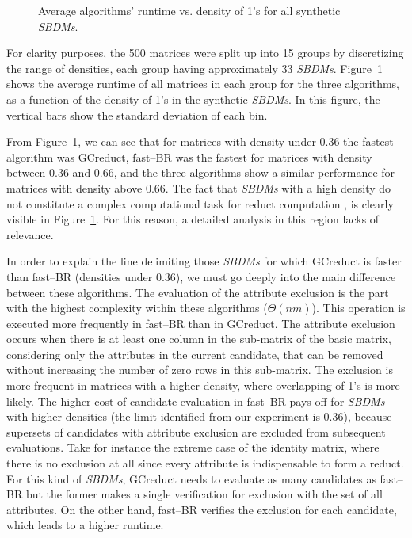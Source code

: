 \documentclass[number,preprint,review,12pt]{elsarticle}
\begin{document}
	\begin{figure}[htb]
		\begin{center}
		\end{center}
		\caption{Average algorithms' runtime vs. density of 1's for all synthetic \textit{SBDMs}.}
		\label{fig:scattDensity}
	\end{figure}	

	For clarity purposes, the 500 matrices were split up into 15 groups by discretizing the range of densities, each group having approximately 33 \textit{SBDMs}. Figure~\ref{fig:scattDensity} shows the average runtime of all  matrices in each group for the three algorithms, as a function of the density of 1's in the synthetic \textit{SBDMs}. In this figure, the vertical bars show the standard deviation of each bin. 
		
	From Figure~\ref{fig:scattDensity}, we can see that for matrices with density under 0.36  the fastest algorithm was GCreduct, fast--BR was the fastest for matrices with density between 0.36 and 0.66, and the three algorithms show a similar performance for matrices with density above 0.66. The fact that \textit{SBDMs} with a high density do not constitute a complex computational task for reduct computation \citep{Rojas12}, is clearly visible in Figure~\ref{fig:scattDensity}. For this reason, a detailed analysis in this region lacks of relevance.
		
	In order to explain the line delimiting those \textit{SBDMs} for which GCreduct is faster than fast--BR (densities under 0.36), we must go deeply into the main difference between these algorithms. The evaluation of the attribute exclusion is the part with the highest complexity within these algorithms ($\Theta (nm)$). This operation is executed more frequently in fast--BR than in GCreduct. The attribute exclusion occurs when there is at least one column in the sub-matrix of the basic matrix, considering only the attributes in the current candidate, that can be removed without increasing the number of zero rows in this sub-matrix. The exclusion is more frequent in matrices with a higher density, where overlapping of 1's is more likely. The higher cost of candidate evaluation in fast--BR pays off for \textit{SBDMs} with higher densities (the limit identified from our experiment is 0.36), because supersets of candidates with attribute exclusion are excluded from subsequent evaluations. Take for instance the extreme case of the identity matrix, where there is no exclusion at all since every attribute is indispensable to form a reduct. For this kind of \textit{SBDMs}, GCreduct needs to evaluate as many candidates as fast--BR but the former makes a single verification for exclusion with the set of all attributes. On the other hand, fast--BR verifies the exclusion for each candidate, which leads to a higher runtime.
	
\end{document}
